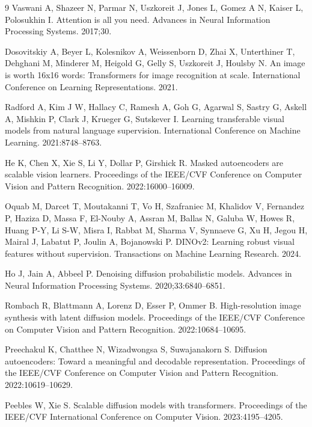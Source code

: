 \documentclass{article}
\begin{document}
\begin{thebibliography}{9}
Vaswani A, Shazeer N, Parmar N, Uszkoreit J, Jones L, Gomez A N, Kaiser L, Polosukhin I. Attention is all you need. Advances in Neural Information Processing Systems. 2017;30.

Dosovitskiy A, Beyer L, Kolesnikov A, Weissenborn D, Zhai X, Unterthiner T, Dehghani M, Minderer M, Heigold G, Gelly S, Uszkoreit J, Houlsby N. An image is worth 16x16 words: Transformers for image recognition at scale. International Conference on Learning Representations. 2021.

Radford A, Kim J W, Hallacy C, Ramesh A, Goh G, Agarwal S, Sastry G, Askell A, Mishkin P, Clark J, Krueger G, Sutskever I. Learning transferable visual models from natural language supervision. International Conference on Machine Learning. 2021:8748--8763.

He K, Chen X, Xie S, Li Y, Dollar P, Girshick R. Masked autoencoders are scalable vision learners. Proceedings of the IEEE/CVF Conference on Computer Vision and Pattern Recognition. 2022:16000--16009.

Oquab M, Darcet T, Moutakanni T, Vo H, Szafraniec M, Khalidov V, Fernandez P, Haziza D, Massa F, El-Nouby A, Assran M, Ballas N, Galuba W, Howes R, Huang P-Y, Li S-W, Misra I, Rabbat M, Sharma V, Synnaeve G, Xu H, Jegou H, Mairal J, Labatut P, Joulin A, Bojanowski P. DINOv2: Learning robust visual features without supervision. Transactions on Machine Learning Research. 2024.

Ho J, Jain A, Abbeel P. Denoising diffusion probabilistic models. Advances in Neural Information Processing Systems. 2020;33:6840--6851.

Rombach R, Blattmann A, Lorenz D, Esser P, Ommer B. High-resolution image synthesis with latent diffusion models. Proceedings of the IEEE/CVF Conference on Computer Vision and Pattern Recognition. 2022:10684--10695.

Preechakul K, Chatthee N, Wizadwongsa S, Suwajanakorn S. Diffusion autoencoders: Toward a meaningful and decodable representation. Proceedings of the IEEE/CVF Conference on Computer Vision and Pattern Recognition. 2022:10619--10629.

Peebles W, Xie S. Scalable diffusion models with transformers. Proceedings of the IEEE/CVF International Conference on Computer Vision. 2023:4195--4205.


\end{thebibliography}
\end{document}
